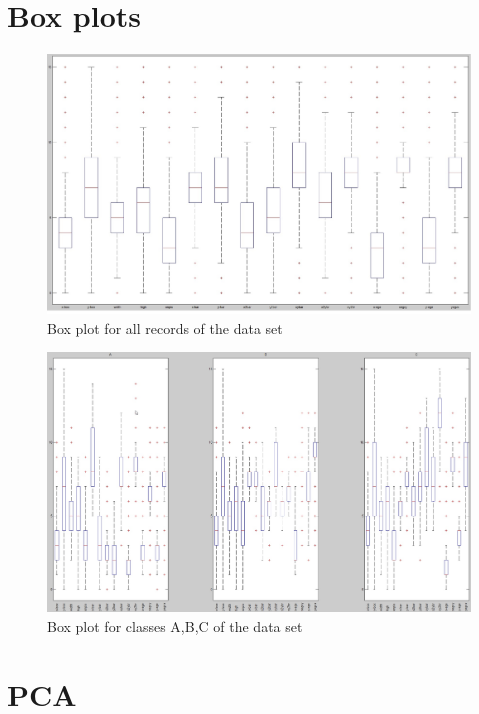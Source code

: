 \section*{Box plots}

\begin{figure}[!tbh]
	\centering
	\includegraphics[width=1\textwidth]{figures/boxplot_all}
	\caption{Box plot for all records of the data set}
	\label{fig:boxplot_all}
\end{figure}

\begin{figure}[!tbh]
	\centering
	\includegraphics[width=1\textwidth]{figures/boxplot_perclass}
	\caption{Box plot for classes A,B,C of the data set}
	\label{fig:boxplot_perclass}
\end{figure}

\section*{PCA}


